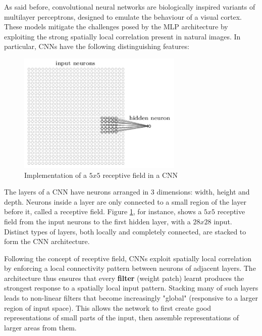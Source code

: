 As said before, convolutional neural networks are biologically inspired variants of multilayer perceptrons, designed to emulate the behaviour of a visual cortex. These models mitigate the challenges posed by the \ac{MLP} architecture by exploiting the strong spatially local correlation present in natural images.
In particular, \acsp{CNN} have the following distinguishing features:

\begin{description}
	
	\begin{figure}
		\centering
		\includegraphics[width=0.7\textwidth]{Images/receptive_field}
		\caption{Implementation of a $5x5$ receptive field in a \acs{CNN}}\label{fig:receptive_field}
	\end{figure}
	
	\item[3D volumes of neurons] The layers of a \acs{CNN} have neurons arranged in 3 dimensions: width, height and depth. Neurons inside a layer are only connected to a small region of the layer before it, called a receptive field. Figure \ref{fig:receptive_field}, for instance, shows a $5x5$ receptive field from the input neurons to the first hidden layer, with a $28x28$ input. Distinct types of layers, both locally and completely connected, are stacked to form the \acs{CNN} architecture.
	
	\item[Local connectivity] Following the concept of receptive field, \acsp{CNN} exploit spatially local correlation by enforcing a local connectivity pattern between neurons of adjacent layers. The architecture thus ensures that every \textbf{filter} (\ie weight patch) learnt produces the strongest response to a spatially local input pattern. Stacking many of such layers leads to non-linear filters that become increasingly "global" (\ie responsive to a larger region of input space). This allows the network to first create good representations of small parts of the input, then assemble representations of larger areas from them.
	

\end{description}
